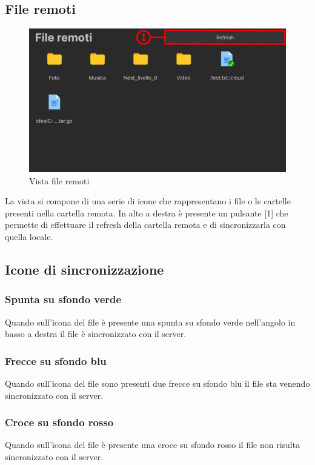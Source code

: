 \subsection{File remoti}
\label{sec:fileRemoti}
\begin{figure}[H]
    \centering
    \includegraphics[scale = 0.8]{components/img/fileRem.png}
    \caption{Vista file remoti}
    \label{fig:fileRem}
\end{figure}
La vista si compone di una serie di icone che rappresentano i file o le cartelle presenti nella cartella remota. In alto a destra è presente un pulsante [1] che permette di effettuare il refresh della cartella remota e di sincronizzarla con quella locale.

\subsection{Icone di sincronizzazione}
\label{sec:iconeSync}
\subsubsection*{Spunta su sfondo verde}
Quando sull'icona del file è presente una spunta su sfondo verde nell'angolo in basso a destra il file è sincronizzato con il server.
\subsubsection*{Frecce su sfondo blu}
Quando sull'icona del file sono presenti due frecce su sfondo blu il file sta venendo sincronizzato con il server.
\subsubsection*{Croce su sfondo rosso}
Quando sull'icona del file è presente una croce su sfondo rosso il file non risulta sincronizzato con il server.

